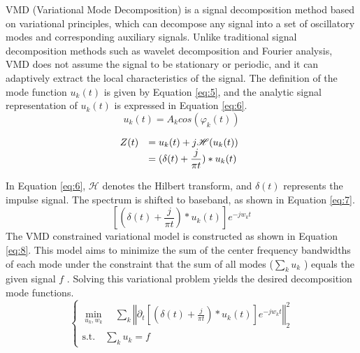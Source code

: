 \documentclass[3p,authoryear,preprint,12pt]{elsarticle}
\begin{document}
VMD (Variational Mode Decomposition) \citep{dragomiretskiyVariationalModeDecomposition2014} is a signal decomposition method based on variational principles, which can decompose any signal into a set of oscillatory modes and corresponding auxiliary signals. Unlike traditional signal decomposition methods such as wavelet decomposition and Fourier analysis, VMD does not assume the signal to be stationary or periodic, and it can adaptively extract the local characteristics of the signal. The definition of the mode function $u_k(t)$  is given by Equation \ref{eq:5}, and the analytic signal representation of $u_k(t)$  is expressed in Equation \ref{eq:6}.
\begin{equation}
	\label{eq:5}
	u_k(t)=A_kcos(\varphi_k(t))
\end{equation}

\begin{equation}
	\label{eq:6}
	\begin{array}{l@{\quad}l@{\quad}l}
		Z(t) &= u_k(t) + j\mathscr{H}(u_k(t)) \\
		&= (\delta(t)+\displaystyle{\frac{j}{\pi t})}\ast u_k(t)
	\end{array}
\end{equation}

In Equation \ref{eq:6}, $\mathscr{H}$  denotes the Hilbert transform, and $\delta(t)$  represents the impulse signal. The spectrum is shifted to baseband, as shown in Equation \ref{eq:7}.
\begin{equation}
	\label{eq:7}
	\left[\left(\delta \left(t\right)+\displaystyle{\frac{j}{\pi t}}\right)\ast {u}_{k}\left(t\right)\right]{e}^{-jw_kt}
\end{equation}
The VMD constrained variational model is constructed as shown in Equation \ref{eq:8}. This model aims to minimize the sum of the center frequency bandwidths of each mode under the constraint that the sum of all modes (${\displaystyle \sum\limits_{k} u_k}$ ) equals the given signal $f$ . Solving this variational problem yields the desired decomposition mode functions.
\begin{equation} 
	\label{eq:8}
	\left\lbrace
	\begin{aligned}
		\min_{{u_k,w_k}} \quad \sum_k \left\Vert \partial_t \left[\left(\delta(t) + \frac{j}{\pi t}\right) \ast u_k(t) \right] e^{-jw_kt} \right\Vert_2^2 \\
		\text{s.t.} \quad \sum_k u_k = f
	\end{aligned}\right.
\end{equation}
\end{document}
